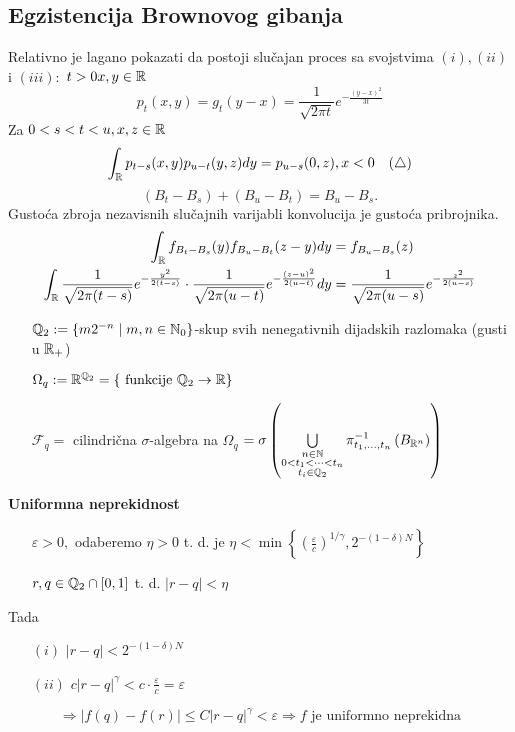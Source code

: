 \documentclass{article}
\begin{document}
\subsection{Egzistencija Brownovog gibanja}
Relativno je lagano pokazati da postoji slučajan proces sa svojstvima \((i),(ii)\) i \((iii):\) \(t>0x,y\in\Bbb R\) \[p_t(x,y)=g_t(y-x)=\frac1{\sqrt{2\pi t}}e^{-\frac{(y-x)^2}{3t}}\]
Za \(0<s<t<u,x,z\in\Bbb R\) \[\int_\Bbb Rp_{t-s}(x,y)p_{u-t}(y,z)dy=p_{u-s}(0,z),x<0\quad(\triangle)\] \[\left(B_t-B_s\right)+\left(B_u-B_t\right)=B_u-B_s.\] Gustoća zbroja nezavisnih slučajnih varijabli konvolucija je gustoća pribrojnika. \[\begin{aligned}\int_\Bbb Rf_{B_t-B_s}(y)f_{B_u-B_t}(z-y)dy&=f_{B_u-B_s}(z)\\\int_\Bbb R\frac1{\sqrt{2\pi(t-s)}}e^{-\frac{y^2}{2(t-s)}}\cdot\frac1{\sqrt{2\pi(u-t)}}e^{-\frac{(z-u)^2}{2(u-t)}}dy&=\frac1{\sqrt{2\pi(u-s)}}e^{-\frac{z^2}{2(u-s)}}\end{aligned}\] 
\begin{enumerate}
    \item[\ding{228}] \(\Bbb Q_2:=\left\{m2^{-n}\mid m,n\in\Bbb N_0\right\}\)-skup svih nenegativnih dijadskih razlomaka (gusti u \(\Bbb R_+\))
    \item[\ding{228}] \(\Omega_q:=\Bbb R^{\Bbb Q_2}=\left\{\text{ funkcije }\Bbb Q_2\to\Bbb R\right\}\)
    \item[\ding{228}] \(\mathcal F_q=\) cilindrična \(\sigma\)-algebra na \(\Omega_q\) \(=\sigma\left(\bigcup\limits_{\substack{n\in\Bbb N\\0<t_1<\cdots<t_n\\t_i\in\Bbb Q_2}}\pi^{-1}_{t_1,\ldots,t_n}\left(B_{\Bbb R^n}\right)\right)\)
\end{enumerate}
\textbf{Uniformna neprekidnost}
\begin{enumerate}
    \item[\ding{113}] \(\varepsilon>0,\) odaberemo \(\eta>0\) t. d. je \(\eta<\min\left\{\left(\frac\varepsilon{c}\right)^{1/\gamma},2^{-(1-\delta)N}\right\}\)
    \item[\ding{113}] \(r,q\in\Bbb Q_2\cap[0,1]\) t. d. \(|r-q|<\eta\)
\end{enumerate}
Tada \begin{enumerate}
    \item[\((i)\)] \(|r-q|<2^{-(1-\delta)N}\)
    \item[\((ii)\)] \(c|r-q|^\gamma<c\cdot\frac\varepsilon{c}=\varepsilon\)
\end{enumerate}
\[\Rightarrow|f(q)-f(r)|\le C|r-q|^\gamma<\varepsilon\Rightarrow f\text{ je uniformno neprekidna}\]
\end{document}
